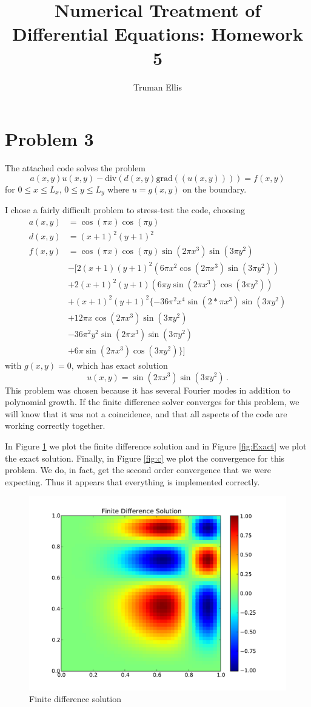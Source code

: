 \documentclass[10pt,letterpaper]{article}
\title{Numerical Treatment of Differential Equations: Homework 5}
\author{Truman Ellis}
\begin{document}
\section*{Problem 3}
The attached code solves the problem
\[
a(x,y)u(x,y)-\mathrm{div}(d(x,y)\mathrm{grad}((u(x,y))))=f(x,y)
\]
for $0\le x\le L_x$, $0\le y\le L_y$ where $u=g(x,y)$ on the boundary.

I chose a fairly difficult problem to stress-test the code, choosing
\begin{align*}
a(x,y)&=\cos(\pi x)\cos(\pi y)\\
d(x,y)&=(x+1)^2(y+1)^2\\
f(x,y)&=\cos(\pi x)\cos(\pi y)\sin(2\pi x^3)\sin(3\pi y^2)\\
&-[2(x+1)(y+1)^2(6\pi x^2\cos(2\pi x^3)\sin(3\pi y^2))\\
&+2(x+1)^2(y+1)(6\pi y\sin(2\pi x^3)\cos(3\pi y^2))\\
&+(x+1)^2(y+1)^2\{-36\pi^2 x^4\sin(2*\pi x^3)\sin(3\pi y^2)\\
&+12\pi x\cos(2\pi x^3)\sin(3\pi y^2)\\
&-36\pi^2 y^2\sin(2\pi x^3)\sin(3\pi y^2)\\
&+6\pi\sin(2\pi x^3)\cos(3\pi y^2)\}]
\end{align*}
with $g(x,y)=0$,
which has exact solution
\[
u(x,y)=\sin(2\pi x^3)\sin(3\pi y^2)\,.
\]
This problem was chosen because it has several Fourier modes in addition to
polynomial growth. If the finite difference solver converges for this problem,
we will know that it was not a coincidence, and that all aspects of the code are
working correctly together.

In Figure \ref{fig:FD} we plot the finite difference solution and in Figure
\ref{fig:Exact} we plot the exact solution.
Finally, in Figure \ref{fig:c} we plot the convergence for this problem.
We do, in fact, get the second order convergence that we were expecting. Thus it
appears that everything is implemented correctly.

\begin{figure}[h]
\begin{center}
\includegraphics[width=5in,keepaspectratio]{FD.pdf}
\end{center}
\caption{Finite difference solution}
\label{fig:FD}
\end{figure}
\end{document}
